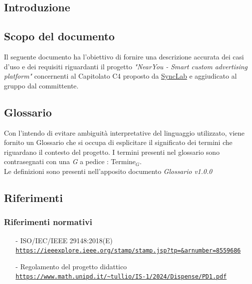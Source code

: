 \documentclass[11pt]{article}
\begin{document}
\newpage
\begin{justify}
    

\section{Introduzione}


\subsection{Scopo del documento}

Il seguente documento ha l'obiettivo di fornire una descrizione accurata dei casi d'uso e dei requisiti riguardanti il progetto \textit{"NearYou - 
Smart custom advertising platform"} concernenti al Capitolato C4 proposto da \href{https://www.synclab.it/home}{SyncLab} e aggiudicato al gruppo dal committente.


\subsection{Glossario}
Con l'intendo di evitare ambiguità interpretative del linguaggio utilizzato, viene fornito un Glossario che si occupa di esplicitare il significato dei termini che riguardano il contesto del progetto. I termini presenti nel glossario sono contrasegnati con una \textit{G} a pedice : Termine\(_G\).\\
Le definizioni sono presenti nell'apposito documento \textit{Glossario v1.0.0}


\subsection{Riferimenti}


\subsubsection{Riferimenti normativi}
\begin{itemize}
    \item[-] ISO/IEC/IEEE 29148:2018(E) \\
    \textcolor{blue}{\texttt{\url{https://ieeexplore.ieee.org/stamp/stamp.jsp?tp=&arnumber=8559686}}}
    
    \item[-] Regolamento del progetto didattico  \\
    \textcolor{blue}{\texttt{\url{https://www.math.unipd.it/~tullio/IS-1/2024/Dispense/PD1.pdf}}}
    
\end{itemize}

\end{justify}
\end{document}
